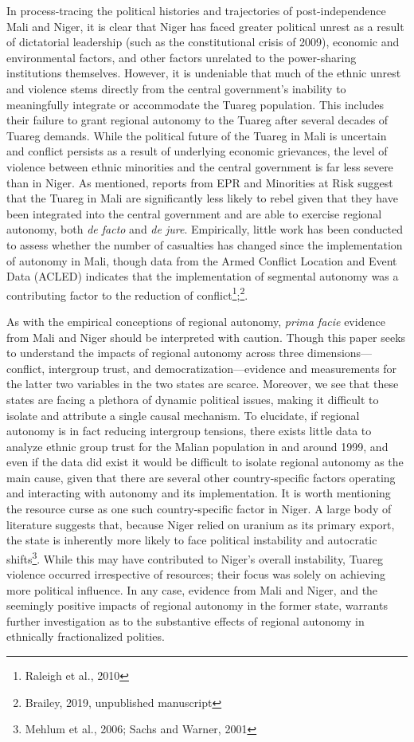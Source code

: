 \documentclass[12pt]{article}
\begin{document}
In process-tracing the political histories and trajectories of post-independence Mali and Niger, it is clear that Niger has faced greater political unrest as a result of dictatorial leadership (such as the constitutional crisis of 2009), economic and environmental factors, and other factors unrelated to the power-sharing institutions themselves. However, it is undeniable that much of the ethnic unrest and violence stems directly from the central government's inability to meaningfully integrate or accommodate the Tuareg population. This includes their failure to grant regional autonomy to the Tuareg after several decades of Tuareg demands. While the political future of the Tuareg in Mali is uncertain and conflict persists as a result of underlying economic grievances, the level of violence between ethnic minorities and the central government is far less severe than in Niger. As mentioned, reports from EPR and Minorities at Risk suggest that the Tuareg in Mali are significantly less likely to rebel given that they have been integrated into the central government and are able to exercise regional autonomy, both \textit{de facto} and \textit{de jure}. Empirically, little work has been conducted to assess whether the number of casualties has changed since the implementation of autonomy in Mali, though data from the Armed Conflict Location and Event Data (ACLED) indicates that the implementation of segmental autonomy was a contributing factor to the reduction of conflict\footnote{Raleigh et al., 2010};\footnote{Brailey, 2019, unpublished manuscript}.

As with the empirical conceptions of regional autonomy, \textit{prima facie} evidence from Mali and Niger should be interpreted with caution. Though this paper seeks to understand the impacts of regional autonomy across three dimensions---conflict, intergroup trust, and democratization---evidence and measurements for the latter two variables in the two states are scarce. Moreover, we see that these states are facing a plethora of dynamic political issues, making it difficult to isolate and attribute a single causal mechanism. To elucidate, if regional autonomy is in fact reducing intergroup tensions, there exists little data to analyze ethnic group trust for the Malian population in and around 1999, and even if the data did exist it would be difficult to isolate regional autonomy as the main cause, given that there are several other country-specific factors operating and interacting with autonomy and its implementation. It is worth mentioning the resource curse as one such country-specific factor in Niger. A large body of literature suggests that, because Niger relied on uranium as its primary export, the state is inherently more likely to face political instability and autocratic shifts\footnote{Mehlum et al., 2006; Sachs and Warner, 2001}. While this may have contributed to Niger's overall instability, Tuareg violence occurred irrespective of resources; their focus was solely on achieving more political influence. In any case, evidence from Mali and Niger, and the seemingly positive impacts of regional autonomy in the former state, warrants further investigation as to the substantive effects of regional autonomy in ethnically fractionalized polities. 
\end{document}
